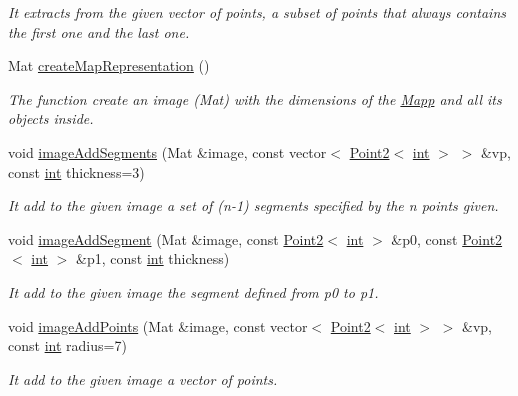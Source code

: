 \begin{DoxyCompactItemize}
\begin{DoxyCompactList}\small\item\em It extracts from the given vector of points, a subset of points that always contains the first one and the last one. \end{DoxyCompactList}\item 
Mat \mbox{\hyperlink{class_mapp_ab68b0efc22947a8f78b3436bbfe3330c}{create\+Map\+Representation}} ()
\begin{DoxyCompactList}\small\item\em The function create an image (Mat) with the dimensions of the \mbox{\hyperlink{class_mapp}{Mapp}} and all its objects inside. \end{DoxyCompactList}\item 
void \mbox{\hyperlink{class_mapp_a4c1148c6feadeb789a6bf7c4ac6569e9}{image\+Add\+Segments}} (Mat \&image, const vector$<$ \mbox{\hyperlink{class_point2}{Point2}}$<$ \mbox{\hyperlink{draw_8hh_aa620a13339ac3a1177c86edc549fda9b}{int}} $>$ $>$ \&vp, const \mbox{\hyperlink{draw_8hh_aa620a13339ac3a1177c86edc549fda9b}{int}} thickness=3)
\begin{DoxyCompactList}\small\item\em It add to the given image a set of (n-\/1) segments specified by the n points given. \end{DoxyCompactList}\item 
void \mbox{\hyperlink{class_mapp_ac82b6ba32304e9985365fbabe9a6d046}{image\+Add\+Segment}} (Mat \&image, const \mbox{\hyperlink{class_point2}{Point2}}$<$ \mbox{\hyperlink{draw_8hh_aa620a13339ac3a1177c86edc549fda9b}{int}} $>$ \&p0, const \mbox{\hyperlink{class_point2}{Point2}}$<$ \mbox{\hyperlink{draw_8hh_aa620a13339ac3a1177c86edc549fda9b}{int}} $>$ \&p1, const \mbox{\hyperlink{draw_8hh_aa620a13339ac3a1177c86edc549fda9b}{int}} thickness)
\begin{DoxyCompactList}\small\item\em It add to the given image the segment defined from p0 to p1. \end{DoxyCompactList}\item 
void \mbox{\hyperlink{class_mapp_a1029eed72b4607bb9be933c124a82ab6}{image\+Add\+Points}} (Mat \&image, const vector$<$ \mbox{\hyperlink{class_point2}{Point2}}$<$ \mbox{\hyperlink{draw_8hh_aa620a13339ac3a1177c86edc549fda9b}{int}} $>$ $>$ \&vp, const \mbox{\hyperlink{draw_8hh_aa620a13339ac3a1177c86edc549fda9b}{int}} radius=7)
\begin{DoxyCompactList}\small\item\em It add to the given image a vector of points. \end{DoxyCompactList}\item 

\end{DoxyCompactItemize}
